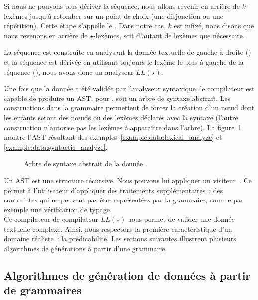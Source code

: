 Si nous ne pouvons plus dériver la séquence, nous allons revenir en arrière de
$k$-lexèmes jusqu'à retomber sur un point de choix (une disjonction ou une
répétition). Cette étape s'appelle le . Dans notre cas,
$k$ est infixé, nous disons que nous revenons en arrière de $\star$-lexèmes,
soit d'autant de lexèmes que nécessaire.

La séquence est construite en analysant la donnée textuelle de gauche à droite
() et la séquence est dérivée en utilisant
toujours le lexème le plus à gauche de la séquence (), nous avons donc un analyseur $LL(\star)$.

Une fois que la donnée a été validée par l'analyseur syntaxique, le compilateur
est capable de produire un AST, pour , soit un
arbre de syntaxe abstrait. Les constructions  dans la grammaire
permettent de forcer la création d'un nœud dont les enfants seront des nœuds ou
des lexèmes déclarés avec la syntaxe  (l'autre construction
 n'autorise pas les lexèmes à apparaître dans l'arbre). La
figure~\ref{figure:data:ast} montre l'AST résultant des
exemples~\ref{example:data:lexical_analyze} et
\ref{example:data:syntactic_analyze}.
%
\begin{figure}


\caption{\label{figure:data:ast} Arbre de syntaxe abstrait de la donnée .}

\end{figure}
%
Un AST est une structure récursive. Nous pouvons lui appliquer un {\strong
visiteur}~. Ce  permet à
l'utilisateur d'appliquer des traitements supplémentaires~: des contraintes qui
ne peuvent pas être représentées par la grammaire, comme par exemple une
vérification de typage. \\

Ce compilateur de compilateur $LL(\star)$ nous permet de valider une donnée
textuelle complexe. Ainsi, nous respectons la première caractéristique d'un
domaine réaliste~: la prédicabilité. Les sections suivantes illustrent plusieurs
algorithmes de générations à partir d'une grammaire.

\subsection{Algorithmes de génération de données à partir de grammaires}
\label{subsection:data:algorithms}

